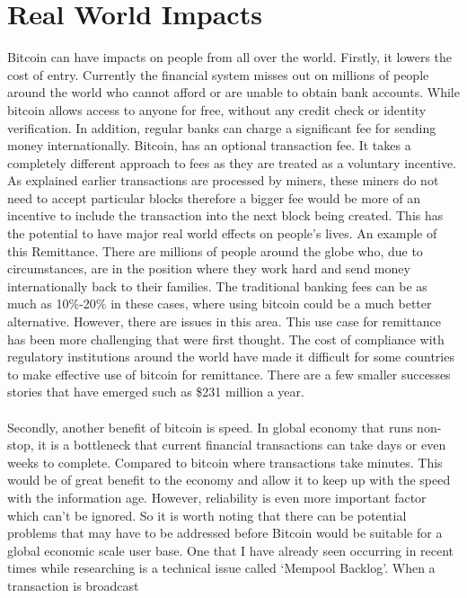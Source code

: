 \documentclass[10pt, a4paper]{report}
\begin{document}
\section*{Real World Impacts}

Bitcoin can have impacts on people from all over the world.
Firstly, it lowers the cost of entry. Currently the financial system
misses out on millions of people around the world who cannot afford or
are unable to obtain bank accounts. While bitcoin allows access to anyone for free,
without any credit check or identity verification.
In addition, regular banks can charge a significant fee for sending money internationally.
Bitcoin, has an optional transaction fee. It takes a completely different approach to fees
as they are treated as a voluntary incentive. As explained earlier transactions are processed
by miners, these miners do not need to accept particular blocks therefore
a bigger fee would be more of an incentive to include the transaction into the next block
being created.
This has the potential to have major real world effects on people's lives.
An example of this Remittance. There are millions of people around the globe
who, due to circumstances, are in the position where they work hard and send
money internationally back to their families. The traditional banking fees
can be as much as 10\%-20\% in these cases, where using bitcoin could be a much better alternative.
However, there are issues in this area. This use case for remittance has
been more challenging that were first thought. The cost of compliance with regulatory
institutions around the world have made it difficult for some countries to
make effective use of bitcoin for remittance. There are a few smaller successes
stories that have emerged such as \$231 million a year.
\\\\
Secondly, another benefit of bitcoin is speed. In global economy that
runs non-stop, it is a bottleneck that current financial transactions can
take days or even weeks to complete. Compared to bitcoin where transactions
take minutes. This would be of great benefit to the economy and allow it to keep up
with the speed with the information age. However,
reliability is even more important factor which can't be ignored.
So it is worth noting that there can be potential problems that may have to be addressed
before Bitcoin would be suitable for a global economic scale user base.
One that I have already seen occurring in recent times while researching is
a technical issue called `Mempool Backlog'. When a transaction is broadcast
\end{document}
